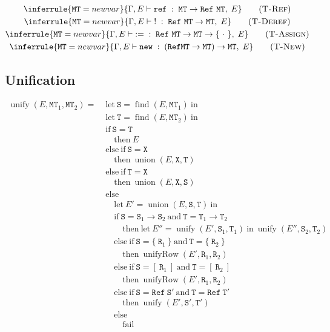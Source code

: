 \documentclass{report}
\newcommand{\code}{\mathtt}
\newcommand{\ruleTag}[1]{\label{#1}\tag{\textsc{#1}}}
\DeclareMathOperator{\union}{union}
\DeclareMathOperator{\find}{find}
\DeclareMathOperator{\unify}{unify}
\DeclareMathOperator{\unifyRow}{unifyRow}
\newcommand{\newVariable}{newvar}
\newcommand{\entails}{\vdash}
\newcommand{\typingRelation}[5]{#1, #2 \entails #3 \;:\; #4 ,\; #5}
\begin{document}
\begin{gather}
\\
\inferrule
{\code{MT} = \newVariable}
{\typingRelation{\Gamma}{E}{\code{ref}}{\code{MT}\rightarrow\code{Ref}\ \code{MT}}{E}}
\ruleTag{T-Ref}
\\
\inferrule
{\code{MT} = \newVariable}
{\typingRelation{\Gamma}{E}{\code{!}}{\code{Ref}\ \code{MT}\rightarrow\code{MT}}{E}}
\ruleTag{T-Deref}
\\
\inferrule
{\code{MT} = \newVariable}
{\typingRelation{\Gamma}{E}{\code{:=}}{\code{Ref}\ \code{MT}\rightarrow\code{MT}\rightarrow\{\ \cdot\ \}}{E}}
\ruleTag{T-Assign}
\\
\inferrule
{\code{MT} = \newVariable}
{\typingRelation{\Gamma}{E}{\code{new}}{(\code{Ref} \code{MT}\rightarrow\code{MT})\rightarrow\code{MT}}{E}}
\ruleTag{T-New}
\end{gather}

\subsection{Unification}

\begin{align*}
\unify(E, \code{MT}_1, \code{MT}_2) = \;
& \text{let}\ \code{S} = \find(E, \code{MT}_1)\ \text{in} \\
& \text{let}\ \code{T} = \find(E, \code{MT}_2)\ \text{in} \\
& \text{if}\ \code{S} = \code{T} \\
& \quad \text{then}\ E \\
& \text{else}\ \text{if}\ \code{S} = \code{X} \\
& \quad \text{then}\ \union(E, \code{X}, \code{T}) \\
& \text{else}\ \text{if}\ \code{T} = \code{X} \\
& \quad \text{then}\ \union(E, \code{X}, \code{S}) \\
& \text{else} \\
& \quad \text{let}\ E' = \union(E, \code{S}, \code{T})\ \text{in} \\
& \quad \text{if}\ \code{S} = \code{S}_{1}\rightarrow\code{S}_{2}\ \text{and}\ \code{T} = \code{T}_{1}\rightarrow\code{T}_{2} \\
& \quad \quad \text{then}\ \text{let}\ E'' = \unify(E', \code{S}_{1}, \code{T}_{1})\ \text{in}\ \unify(E'', \code{S}_{2}, \code{T}_{2}) \\
& \quad \text{else}\ \text{if}\ \code{S} = \{\ \code{R}_1\ \}\ \text{and}\ \code{T} = \{\ \code{R}_2\ \} \\
& \quad \quad \text{then}\ \unifyRow(E', \code{R}_1, \code{R}_2) \\
& \quad \text{else}\ \text{if}\ \code{S} = [\ \code{R}_1\ ]\ \text{and}\ \code{T} = [\ \code{R}_2\ ] \\
& \quad \quad \text{then}\ \unifyRow(E', \code{R}_1, \code{R}_2) \\
& \quad \text{else}\ \text{if}\ \code{S} = \code{Ref}\ \code{S}'\ \text{and}\ \code{T} = \code{Ref}\ \code{T}' \\
& \quad \quad\text{then}\ \unify(E', \code{S}', \code{T}') \\
& \quad \text{else} \\
& \quad \quad \text{fail}
\end{align*}
\end{document}
